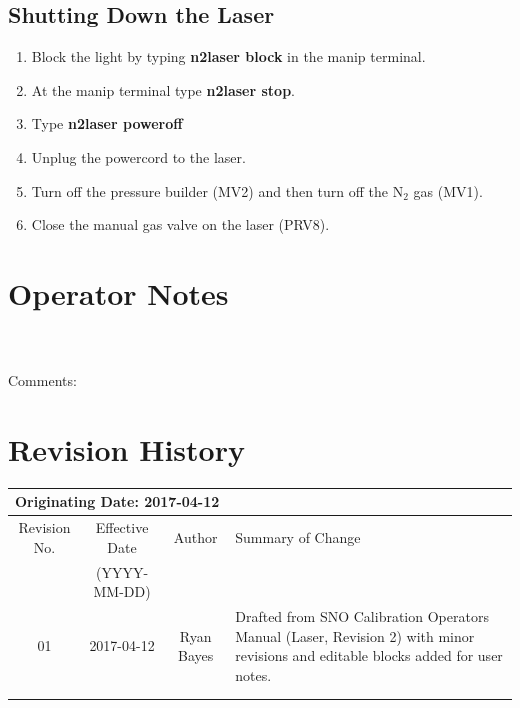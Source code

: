 \subsection{Shutting Down the Laser}
\begin{enumerate}
\item \CheckBox[name=sdl1]{} Block the light by typing {\bf n2laser block} in the manip terminal.
\item \CheckBox[name=sdl2]{} At the manip terminal type {\bf n2laser stop}.
\item \CheckBox[name=sdl3]{} Type {\bf n2laser poweroff}
\item \CheckBox[name=sdl4]{} Unplug the powercord to the laser.
\item \CheckBox[name=sdl5]{} Turn off the pressure builder (MV2) and then turn off the N$_{2}$ gas (MV1).
\item \CheckBox[name=sdl6]{} Close the manual gas valve on the laser (PRV8).
\end{enumerate}

\section{Operator Notes}
\\ 
\\ 
Comments:\\
\TextField[name=opt,backgroundcolor=0.975 0.975 0.975,width=15cm,height=4.5cm]{}
\section{Revision History}
\begin{tabular}{|c|c|c|p{6cm}|}
\hline\hline
\multicolumn{4}{|l|}{Originating Date: 2017-04-12}\\
\hline
Revision No. & Effective Date & Author & Summary of Change \\
& (YYYY-MM-DD) & & \\
\hline
01 & 2017-04-12 & Ryan Bayes & Drafted from SNO Calibration Operators Manual (Laser, Revision 2) with minor revisions and editable blocks added for user notes.\\
\hline
& & & \\
\hline
& & & \\
\hline \hline

\end{tabular}
